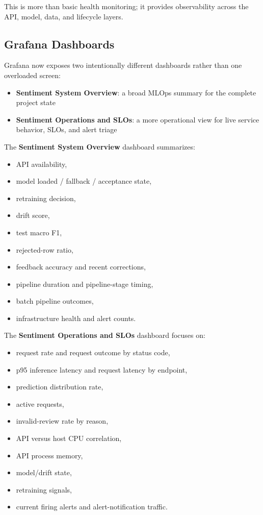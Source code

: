 \documentclass[11pt,a4paper]{article}
\begin{document}
This is more than basic health monitoring; it provides observability across the API, model, data, and lifecycle layers.

\subsection{Grafana Dashboards}

Grafana now exposes two intentionally different dashboards rather than one overloaded screen:

\begin{itemize}[leftmargin=1.4em]
  \item \textbf{Sentiment System Overview}: a broad MLOps summary for the complete project state
  \item \textbf{Sentiment Operations and SLOs}: a more operational view for live service behavior, SLOs, and alert triage
\end{itemize}

The \textbf{Sentiment System Overview} dashboard summarizes:

\begin{itemize}[leftmargin=1.4em]
  \item API availability,
  \item model loaded / fallback / acceptance state,
  \item retraining decision,
  \item drift score,
  \item test macro F1,
  \item rejected-row ratio,
  \item feedback accuracy and recent corrections,
  \item pipeline duration and pipeline-stage timing,
  \item batch pipeline outcomes,
  \item infrastructure health and alert counts.
\end{itemize}

The \textbf{Sentiment Operations and SLOs} dashboard focuses on:

\begin{itemize}[leftmargin=1.4em]
  \item request rate and request outcome by status code,
  \item p95 inference latency and request latency by endpoint,
  \item prediction distribution rate,
  \item active requests,
  \item invalid-review rate by reason,
  \item API versus host CPU correlation,
  \item API process memory,
  \item model/drift state,
  \item retraining signals,
  \item current firing alerts and alert-notification traffic.
\end{itemize}
\end{document}
